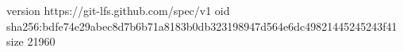 version https://git-lfs.github.com/spec/v1
oid sha256:bdfe74e29abec8d7b6b71a8183b0db323198947d564e6dc49821445245243f41
size 21960
